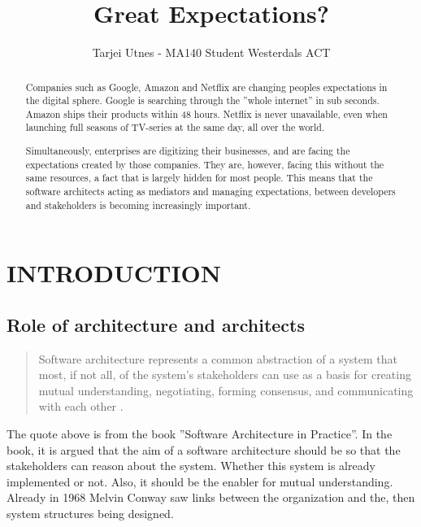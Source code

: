 \documentclass[a4paper, 10pt, conference]{IEEEtran}
\title{\LARGE \bf
Great Expectations?}
\author{Tarjei Utnes - MA140 Student Westerdals ACT}%
\begin{document}
\maketitle
\thispagestyle{empty}
\pagestyle{empty}


\begin{abstract}

Companies such as Google, Amazon and Netflix are changing peoples expectations in the digital sphere. Google is searching through the ''whole internet'' in sub seconds. Amazon ships their products within 48 hours. Netflix is never unavailable, even when launching full seasons of TV-series at the same day, all over the world.

Simultaneously, enterprises are digitizing their businesses, and are facing the expectations created by those companies. They are, however, facing this without the same resources, a fact that is largely hidden for most people.
This means that the software architects acting as mediators and managing expectations, between developers and stakeholders is becoming increasingly important.
\end{abstract}


\section{INTRODUCTION}
\subsection{Role of architecture and architects}
\blockquote{Software architecture represents a common abstraction of a system that most, if not all, of the system’s stakeholders can use as a basis for creating mutual understanding, negotiating, forming consensus, and communicating with each other \cite{c1}.}

The quote above is from the book ''Software Architecture in Practice''\cite{c1}. In the book, it is argued that the aim of a software architecture should be so that the stakeholders can reason about the system. Whether this system is already implemented or not. Also, it should be the enabler for mutual understanding.
Already in 1968 Melvin Conway \cite{c3} saw links between the organization and the, then system structures being designed.
\end{document}

